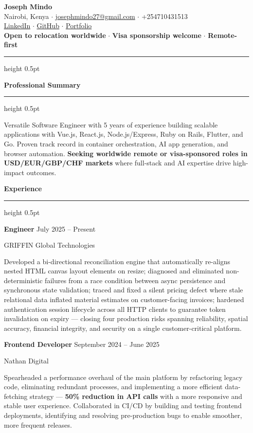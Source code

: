 \documentclass[10pt,a4paper]{article}
\newcommand{\cvsection}[1]{%
    \par\vspace{8pt}%
    {\color{headingcolor}\Large\bfseries #1}\par
    \vspace{2pt}%
    {\color{rulecolor}\hrule height 0.5pt}%
    \vspace{4pt}%
}
\newcommand{\entry}[4]{%
    \par\vspace{4pt}
    {\textbf{#1} \hfill #2}\par
    {\small #3 \hfill #4}\par
    \vspace{2pt}
}
\begin{document}
\begin{center}
    {\Huge\bfseries Joseph Mindo}\\[4pt]
    {\small Nairobi, Kenya $\cdot$ \href{mailto:josephmindo27@gmail.com}{josephmindo27@gmail.com} $\cdot$ +254710431513}\\[4pt]
    {\small \href{https://linkedin.com/in/josephmindo}{LinkedIn} $\cdot$ \href{https://github.com/Mindo-Joseph}{GitHub} $\cdot$ \href{https://site-joe.vercel.app}{Portfolio}}\\[4pt]
    {\small \textbf{Open to relocation worldwide} $\cdot$ \textbf{Visa sponsorship welcome} $\cdot$ \textbf{Remote-first}}
\end{center}

\vspace{6pt}
{\color{rulecolor}\hrule height 0.5pt}
\vspace{4pt}

\cvsection{Professional Summary}
Versatile Software Engineer with 5 years of experience building scalable applications with Vue.js, React.js, Node.js/Express, Ruby on Rails, Flutter, and Go. Proven track record in container orchestration, AI app generation, and browser automation. \textbf{Seeking worldwide remote or visa-sponsored roles in USD/EUR/GBP/CHF markets} where full-stack and AI expertise drive high-impact outcomes.

\cvsection{Experience}

\entry{Engineer}{July 2025 -- Present}{GRIFFIN Global Technologies}{}
Developed a bi-directional reconciliation engine that automatically re-aligns nested HTML canvas layout elements on resize; diagnosed and eliminated non-deterministic failures from a race condition between async persistence and synchronous state validation; traced and fixed a silent pricing defect where stale relational data inflated material estimates on customer-facing invoices; hardened authentication session lifecycle across all HTTP clients to guarantee token invalidation on expiry --- closing four production risks spanning reliability, spatial accuracy, financial integrity, and security on a single customer-critical platform.

\vspace{4pt}

\entry{Frontend Developer}{September 2024 -- June 2025}{Nathan Digital}{}
Spearheaded a performance overhaul of the main platform by refactoring legacy code, eliminating redundant processes, and implementing a more efficient data-fetching strategy --- \textbf{50\% reduction in API calls} with a more responsive and stable user experience. Collaborated in CI/CD by building and testing frontend deployments, identifying and resolving pre-production bugs to enable smoother, more frequent releases.
\end{document}
